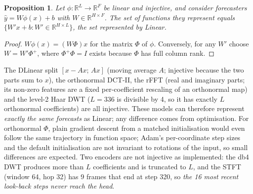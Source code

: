 \documentclass[11pt,a4paper]{article}
\newtheorem{proposition}{Proposition}
\begin{document}
\begin{proposition}
Let $\phi:\mathbb{R}^L\to\mathbb{R}^F$ be linear and injective, and consider forecasters $\hat y = W\phi(x)+b$ with $W\in\mathbb{R}^{H\times F}$. The set of functions they represent equals $\{W'x+b : W'\in\mathbb{R}^{H\times L}\}$, the set represented by Linear.
\end{proposition}
\begin{proof}
$W\phi(x) = (W\Phi)x$ for the matrix $\Phi$ of $\phi$. Conversely, for any $W'$ choose $W = W'\Phi^{+}$, where $\Phi^{+}\Phi = I$ exists because $\Phi$ has full column rank.
\end{proof}
The DLinear split $[x-Ax;\,Ax]$ (moving average $A$; injective because the two parts sum to $x$), the orthonormal DCT-II, the rFFT (real and imaginary parts; its non-zero features are a fixed per-coefficient rescaling of an orthonormal map) and the level-2 Haar DWT ($L=336$ is divisible by 4, so it has exactly $L$ orthonormal coefficients) are all injective. These models can therefore represent \emph{exactly the same forecasts} as Linear; any difference comes from optimisation. For orthonormal $\Phi$, plain gradient descent from a matched initialisation would even follow the same trajectory in function space; Adam's per-coordinate step sizes and the default initialisation are not invariant to rotations of the input, so small differences are expected. Two encoders are not injective as implemented: the db4 DWT produces more than $L$ coefficients and is truncated to $L$, and the STFT (window 64, hop 32) has 9 frames that end at step 320, so \emph{the 16 most recent look-back steps never reach the head}.

\begin{table}[t]
\centering
\scriptsize
\setlength{\tabcolsep}{2.5pt}
\resizebox{\columnwidth}{!}{}
\caption{\textbf{Transform ablation} (RevIN + transform + linear head). Mean relative MSE change versus Linear (\%) per dataset, overall mean, cells better than Linear, and mean rank among the seven inputs. Full results: Table~\ref{tab:transform_full}.}
\label{tab:transform}
\end{table}
\end{document}
